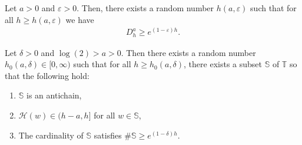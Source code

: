 \documentclass[10pt,a4paper]{amsart}
\begin{document}
\begin{proposition} \label{prop:heightlower}
Let $a > 0$ and $\varepsilon > 0$. Then, there exists a random number $h(a,\varepsilon)$ such that for all $h \geq h(a,\varepsilon)$ we have
\begin{align*}
D_h^a \geq e^{ (1 - \varepsilon) h}.
\end{align*}
\end{proposition}

	\begin{thm} \label{thm:antichains}
		Let $\delta > 0 $ and  $ \log(2) > a > 0$. 
		Then there exists a random number $h_0(a,\delta)\in[0,\infty)$ such that for all $h \geq h_0(a,\delta)$, 
		there exists a subset $\mathbb{S}$ of $\mathbb{T}$ so that the following hold:
		\begin{enumerate}
			\item $\mathbb{S}$ is an antichain,
			\item $\mathcal{H}(w) \in (h-a,h]$ for all $w \in \mathbb{S}$,
			\item The cardinality of $\mathbb{S}$ satisfies $\# \mathbb{S} \geq e^{ (1 - \delta)h}$.
		\end{enumerate}
	\end{thm}
\end{document}
